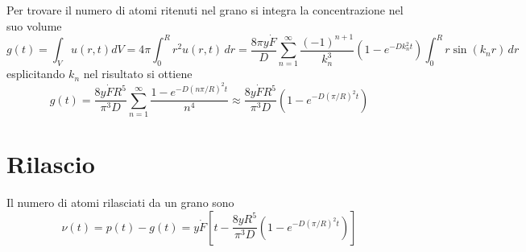 \documentclass{article}
\begin{document}
Per trovare il numero di atomi ritenuti nel grano si integra la concentrazione nel suo volume
\[
  g(t) = \int_V u(r,t) dV = 4\pi\int_0^R r^2 u(r,t) \, dr = \frac{8\pi y\dot{F}}{D}\sum_{n=1}^{\infty} \frac{(-1)^{n+1}}{k_n^3}\left(1 - e^{-Dk_n^2t}\right)\int_0^R r\sin(k_nr) \, dr
\]
esplicitando \(k_n\) nel risultato si ottiene
\[
  g(t) = \frac{8y\dot{F}R^5}{\pi^3D}\sum_{n=1}^\infty \frac{1 - e^{-D\left( n\pi/R \right)^2t}} {n^4} \approx \frac{8y\dot{F}R^5}{\pi^3D}\left(1 - e^{-D\left( \pi/R \right)^2t} \right)
\]

\section{Rilascio}
Il numero di atomi rilasciati da un grano sono
\[
  \nu(t) = p(t) - g(t) = y\dot{F}\left[ t - \frac{8yR^5}{\pi^3D}(1 - e^{-D\left( \pi/R \right)^2t})\right]
\]
\end{document}
